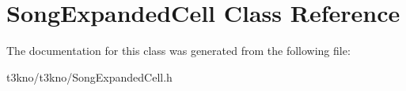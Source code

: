 \hypertarget{interface_song_expanded_cell}{\section{Song\-Expanded\-Cell Class Reference}
\label{interface_song_expanded_cell}
}


The documentation for this class was generated from the following file\-:\begin{DoxyCompactItemize}
\item 
t3kno/t3kno/Song\-Expanded\-Cell.\-h\end{DoxyCompactItemize}
